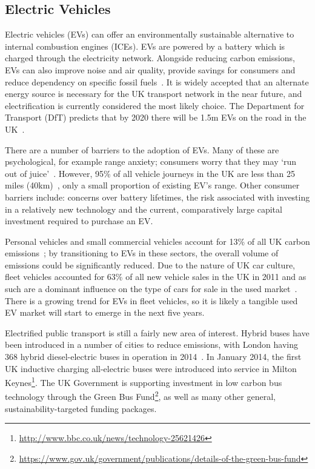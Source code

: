 \documentclass[journal]{IEEEtran}
\begin{document}
\subsection{Electric Vehicles}

Electric vehicles (EVs) can offer an environmentally sustainable
alternative to internal combustion engines (ICEs). EVs are powered by
a battery which is charged through the electricity network. Alongside
reducing carbon emissions, EVs can also improve noise and air quality,
provide savings for consumers and reduce dependency on specific fossil
fuels~\cite{postevs:2010}. It is widely accepted that an alternate
energy source is necessary for the UK transport network in the near
future, and electrification is currently considered the most likely
choice.  The Department for Transport (DfT) predicts that by 2020
there will be 1.5m EVs on the road in the UK~\cite{dft:2008}.

There are a number of barriers to the adoption of EVs. Many of these
are psychological, for example range anxiety; consumers worry that
they may `run out of juice'~\cite{oflev:2011}. However, 95\% of all
vehicle journeys in the UK are less than 25 miles
(40km)~\cite{oflev:2011}, only a small proportion of existing EV's
range. Other consumer barriers include: concerns over battery
lifetimes, the risk associated with investing in a relatively new
technology and the current, comparatively large capital investment
required to purchase an EV.

Personal vehicles and small commercial vehicles account for 13\% of
all UK carbon emissions~\cite{lumsden:2012}; by transitioning to EVs
in these sectors, the overall volume of emissions could be
significantly reduced.  Due to the nature of UK car culture, fleet
vehicles accounted for 63\% of all new vehicle sales in the UK in 2011
and as such are a dominant influence on the type of cars for sale in
the used market~\cite{fleets:2012}. There is a growing trend for EVs
in fleet vehicles, so it is likely a tangible used EV market will
start to emerge in the next five years.

Electrified public transport is still a fairly new area of
interest. Hybrid buses have been introduced in a number of cities to
reduce emissions, with London having 368 hybrid diesel-electric buses
in operation in 2014~\cite{tfl:2009}. In January 2014, the first UK
inductive charging all-electric buses were introduced into service in
Milton
Keynes\footnote{\url{http://www.bbc.co.uk/news/technology-25621426}}. The
UK Government is supporting investment in low carbon bus technology
through the Green Bus
Fund\footnote{\url{https://www.gov.uk/government/publications/details-of-the-green-bus-fund}},
as well as many other general, sustainability-targeted funding
packages.
\end{document}
